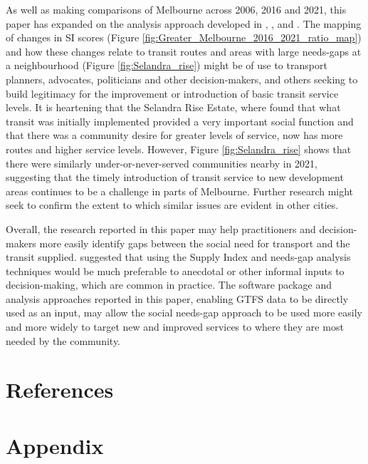 \documentclass[preprint, 3p,
authoryear]{elsarticle} %
\begin{document}
As well as making comparisons of Melbourne across 2006, 2016 and 2021,
this paper has expanded on the analysis approach developed in
\citet{Currie2003Hobart}, \citet{Currie2004Gap},
\citet{Currie2007Identifying} and \citet{currie2010identifying}. The
mapping of changes in SI scores (Figure
\ref{fig:Greater_Melbourne_2016_2021_ratio_map}) and how these changes
relate to transit routes and areas with large needs-gaps at a
neighbourhood (Figure \ref{fig:Selandra_rise}) might be of use to
transport planners, advocates, politicians and other decision-makers,
and others seeking to build legitimacy for the improvement or
introduction of basic transit service levels. It is heartening that the
Selandra Rise Estate, where \citet{delbosc2015impact} found that what
transit was initially implemented provided a very important social
function and that there was a community desire for greater levels of
service, now has more routes and higher service levels. However, Figure
\ref{fig:Selandra_rise} shows that there were similarly
under-or-never-served communities nearby in 2021, suggesting that the
timely introduction of transit service to new development areas
continues to be a challenge in parts of Melbourne. Further research
might seek to confirm the extent to which similar issues are evident in
other cities.

Overall, the research reported in this paper may help practitioners and
decision-makers more easily identify gaps between the social need for
transport and the transit supplied. \citet{currie2010identifying}
suggested that using the Supply Index and needs-gap analysis techniques
would be much preferable to anecdotal or other informal inputs to
decision-making, which are common in practice. The software package and
analysis approaches reported in this paper, enabling GTFS data to be
directly used as an input, may allow the social needs-gap approach to be
used more easily and more widely to target new and improved services to
where they are most needed by the community.

\section*{References}\label{references}

\section{Appendix}\label{appendix}
\end{document}
